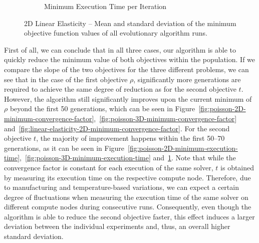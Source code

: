 \begin{figure}
\begin{subfigure}[b]{0.49\textwidth}
		\caption{Minimum Execution Time per Iteration}
		\label{fig:linear-elasticity-2D-minimum-execution-time}
	\end{subfigure}
	\caption{2D Linear Elasticity -- Mean and standard deviation of the minimum objective function values of all evolutionary algorithm runs.}
	\label{fig:linear-elasticity-2D-minimum-objectives}
\end{figure}
First of all, we can conclude that in all three cases, our algorithm is able to quickly reduce the minimum value of both objectives within the population.
If we compare the slope of the two objectives for the three different problems, we can see that in the case of the first objective $\rho$, significantly more generations are required to achieve the same degree of reduction as for the second objective $t$.
However, the algorithm still significantly improves upon the current minimum of $\rho$ beyond the first 50 generations, which can be seen in Figure~\ref{fig:poisson-2D-minimum-convergence-factor},~\ref{fig:poisson-3D-minimum-convergence-factor} and~\ref{fig:linear-elasticity-2D-minimum-convergence-factor}.
For the second objective $t$, the majority of improvement happens within the first 50--70 generations, as it can be seen in Figure~\ref{fig:poisson-2D-minimum-execution-time},~\ref{fig:poisson-3D-minimum-execution-time} and~\ref{fig:linear-elasticity-2D-minimum-execution-time}.
Note that while the convergence factor is constant for each execution of the same solver, $t$ is obtained by measuring its execution time on the respective compute node.
Therefore, due to manufacturing and temperature-based variations, we can expect a certain degree of fluctuations when measuring the execution time of the same solver on different compute nodes during consecutive runs.
Consequently, even though the algorithm is able to reduce the second objective faster, this effect induces a larger deviation between the individual experiments and, thus, an overall higher standard deviation.

